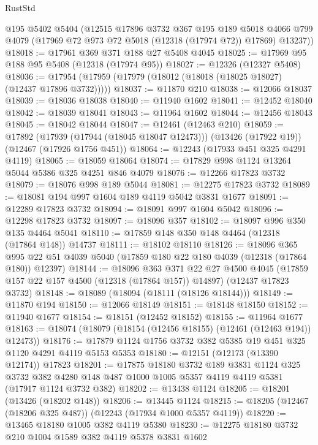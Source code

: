 \begin{lexlean}{RustStd}
\begin{coremodule}
      @195
      @5402
      @5404
      (@12515
        @17896
        @3732
        @367
        @195
        @189
        @5018
        @4066
        @799
        @4079
        (@17969 @72 @973 @72 @5018 (@12318 (@17974 @72)) @17869)
        @13237))
@18018 := @17961 @369 @371 @188 @27 @5408 @4045
@18025 := @17969 @95 @188 @95 @5408 (@12318 (@17974 @95))
@18027 := @12326 (@12327 @5408)
@18036 := @17954 (@17959 (@17979 (@18012 (@18018 (@18025 @18027) (@12437 @17896 @3732)))))
@18037 := @11870 @210
@18038 := @12066 @18037
@18039 := @18036 @18038
@18040 := @11940 @1602
@18041 := @12452 @18040
@18042 := @18039 @18041
@18043 := @11964 @1602
@18044 := @12456 @18043
@18045 := @18042 @18044
@18047 := @12461 (@12463 @210)
@18059 := @17892
    (@17939 (@17944 (@18045 @18047 @12473)))
    (@13426 (@17922 @19))
    (@12467 (@17926 @1756 @451))
@18064 := @12243 (@17933 @451 @325 @4291 @4119)
@18065 := @18059 @18064
@18074 := @17829 @998 @1124 @13264 @5044 @5386 @325 @4251 @846 @4079
@18076 := @12266 @17823 @3732
@18079 := @18076 @998 @189 @5044
@18081 := @12275 @17823 @3732
@18089 := @18081 @194 @997 @1604 @189 @4119 @5042 @3831 @1677
@18091 := @12289 @17823 @3732
@18094 := @18091 @997 @1604 @5042
@18096 := @12298 @17823 @3732
@18097 := @18096 @357
@18102 := @18097 @996 @350 @135 @4464 @5041
@18110 := @17859 @148 @350 @148 @4464 (@12318 (@17864 @148)) @14737
@18111 := @18102 @18110
@18126 := @18096
    @365
    @995
    @22
    @51
    @4039
    @5040
    (@17859 @180 @22 @180 @4039 (@12318 (@17864 @180)) @12397)
@18144 := @18096
    @363
    @371
    @22
    @27
    @4500
    @4045
    (@17859 @157 @22 @157 @4500 (@12318 (@17864 @157)) @14897)
    (@12437 @17823 @3732)
@18148 := @18089 (@18094 (@18111 (@18126 @18144)))
@18149 := @11870 @194
@18150 := @12066 @18149
@18151 := @18148 @18150
@18152 := @11940 @1677
@18154 := @18151 (@12452 @18152)
@18155 := @11964 @1677
@18163 := @18074 (@18079 (@18154 (@12456 @18155) (@12461 (@12463 @194)) @12473))
@18176 := @17879 @1124 @1756 @3732 @382 @5385 @19 @451 @325 @1120 @4291 @4119 @5153 @5353
@18180 := @12151 (@12173 (@13390 @12174)) @17823
@18201 := @17875
    @18180
    @3732
    @189
    @3831
    @1124
    @325
    @3732
    @382
    @4280
    @148
    @487
    @1000
    @1005
    @5357
    @4119
    @4119
    @5381
    (@17917 @1124 @3732 @382)
@18202 := @13438 @1124
@18205 := @18201 (@13426 (@18202 @148))
@18206 := @13445 @1124
@18215 := @18205 (@12467 (@18206 @325 @487)) (@12243 (@17934 @1000 @5357 @4119))
@18220 := @13465 @18180 @1005 @382 @4119 @5380
@18230 := @12275 @18180 @3732 @210 @1004 @1589 @382 @4119 @5378 @3831 @1602

\end{coremodule}
\end{lexlean}

